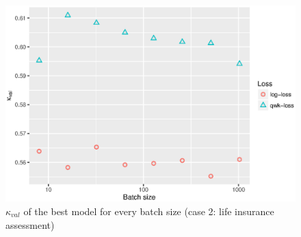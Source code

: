 \begin{figure}[!htb]
	\centering
	\includegraphics[width=\textwidth]{Figures/chapter_loss/prudential-results.eps}
	\caption[$QWK_{val}$ vs BS - Life insurance assessment use case]{$\kappa_{val}$ of the best model for every batch size (case 2: life insurance assessment)}
	\label{loss:fig:prudential}
\end{figure}

